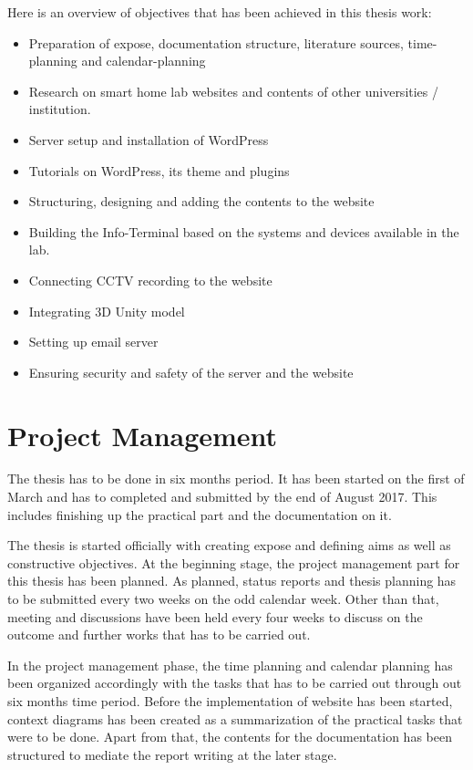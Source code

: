 Here is an overview of objectives that has been achieved in this thesis work:
\begin{itemize}
\item Preparation of expose, documentation structure, literature sources, time-planning and calendar-planning
\item Research on smart home lab websites and contents of other universities / institution.
\item Server setup and installation of WordPress
\item Tutorials on WordPress, its theme and plugins
\item Structuring, designing and adding the contents to the website
\item Building the Info-Terminal based on the systems and devices available in the lab.
\item Connecting CCTV recording to the website
\item Integrating 3D Unity model
\item Setting up email server
\item Ensuring security and safety of the server and the website
\end{itemize}

\section{Project Management}
The thesis has to be done in six months period. It has been started on the first of March and has to completed and submitted by the end of August 2017. This includes finishing up the practical part and the documentation on it.

The thesis is started officially with creating expose and defining aims as well as constructive objectives. At the beginning stage, the project management part for this thesis has been planned. As planned, status reports and thesis planning has to be submitted every two weeks on the odd calendar week. Other than that, meeting and discussions have been held every four weeks to discuss on the outcome and further works that has to be carried out.

In the project management phase, the time planning and calendar planning has been organized accordingly with the tasks that has to be carried out through out six months time period. Before the implementation of website has been started, context diagrams has been created as a summarization of the practical tasks that were to be done. Apart from that, the contents for the documentation has been structured to mediate the report writing at the later stage.

